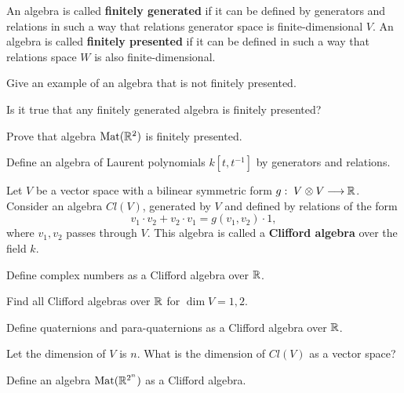 \documentclass[12pt]{article}
\begin{document}
\begin{opredelenie}
  An algebra is called {\bf finitely generated} if it can be defined
  by generators and relations in such a way that relations generator
  space is finite-dimensional $V$. An algebra is called {\bf finitely
    presented} if it can be defined in such a way that relations space
  $W$ is also finite-dimensional.
\end{opredelenie}

\begin{zadacha}
Give an example of an algebra that is not finitely presented.
\end{zadacha}

\begin{zadacha}[*]
Is it true that any finitely generated algebra is finitely presented?
\end{zadacha}

\begin{zadacha} 
Prove that algebra $\operatorname{Mat}({\mathbb R}^2)$ is finitely presented.
\end{zadacha}

\begin{zadacha} 
Define an algebra of Laurent polynomials $k[t, t^{-1}]$ by generators
and relations.
\end{zadacha}

\begin{opredelenie}
Let $V$ be a vector space with a bilinear symmetric form 
$g:\; V \otimes V {\:\longrightarrow\:} {\mathbb R}$.  Consider an algebra  $Cl(V)$,
generated by $V$ and defined by relations of the form
\[ 
v_1\cdot v_2 + v_2\cdot v_1 = g(v_1, v_2)\cdot 1,
\] 
where $v_1, v_2$ passes through $V$. This algebra is called a   
{\bf Clifford algebra} over the field $k$.
\end{opredelenie}

\begin{zadacha}
  Define complex numbers as a Clifford algebra over ${\mathbb R}$.
\end{zadacha}

\begin{zadacha}
Find all Clifford algebras over ${\mathbb R}$ for $\dim V=1,2$.
\end{zadacha}

\begin{zadacha}[!]
Define quaternions and para-quaternions as a Clifford algebra over
${\mathbb R}$. 
\end{zadacha}

\begin{zadacha}[*]
  Let the dimension of $V$ is $n$.  What is the dimension of $Cl(V)$
  as a vector space?
\end{zadacha}

\begin{zadacha}[**] Define an algebra $\operatorname{Mat}({\mathbb R}^{2^n})$
as a Clifford algebra.
\end{zadacha}
\end{document}
